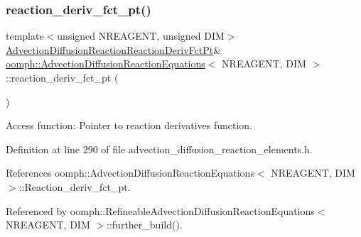 \subsubsection{\texorpdfstring{reaction\+\_\+deriv\+\_\+fct\+\_\+pt()}{reaction\_deriv\_fct\_pt()}\hspace{0.1cm}{\footnotesize\ttfamily [1/2]}}
{\footnotesize\ttfamily template$<$unsigned N\+R\+E\+A\+G\+E\+NT, unsigned D\+IM$>$ \\
\hyperlink{classoomph_1_1AdvectionDiffusionReactionEquations_af7afb472439d8e83b825c0a3c03190a7}{Advection\+Diffusion\+Reaction\+Reaction\+Deriv\+Fct\+Pt}\& \hyperlink{classoomph_1_1AdvectionDiffusionReactionEquations}{oomph\+::\+Advection\+Diffusion\+Reaction\+Equations}$<$ N\+R\+E\+A\+G\+E\+NT, D\+IM $>$\+::reaction\+\_\+deriv\+\_\+fct\+\_\+pt (\begin{DoxyParamCaption}{ }\end{DoxyParamCaption})\hspace{0.3cm}{\ttfamily [inline]}}



Access function\+: Pointer to reaction derivatives function. 



Definition at line 290 of file advection\+\_\+diffusion\+\_\+reaction\+\_\+elements.\+h.



References oomph\+::\+Advection\+Diffusion\+Reaction\+Equations$<$ N\+R\+E\+A\+G\+E\+N\+T, D\+I\+M $>$\+::\+Reaction\+\_\+deriv\+\_\+fct\+\_\+pt.



Referenced by oomph\+::\+Refineable\+Advection\+Diffusion\+Reaction\+Equations$<$ N\+R\+E\+A\+G\+E\+N\+T, D\+I\+M $>$\+::further\+\_\+build().

\mbox{\label{classoomph_1_1AdvectionDiffusionReactionEquations_ab015795d32200187c4ff16b63ef04066}} 

